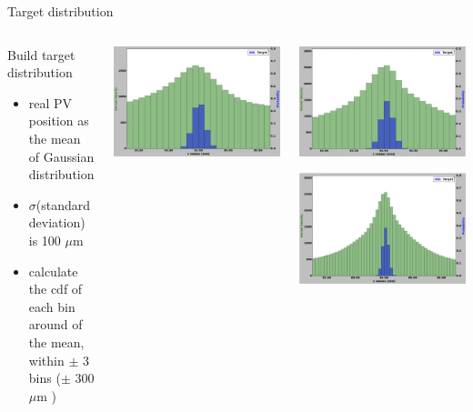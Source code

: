 \begin{frame}{Target distribution}
\begin{columns}[c]
    \begin{block}{Build target distribution}
      \begin{itemize}
          \item real PV position as the mean of Gaussian distribution
          \item $\sigma $(standard deviation) is 100 $\mu$m
          \item calculate the cdf of each bin around of the mean, within $\pm$ 3 bins ($\pm$ 300 $\mu$m )
      \end{itemize}
    \end{block}
    \begin{center}
            \includegraphics[width=1\textwidth,height=0.45\textwidth,trim=18 0 18 0]{images/T_1_12.png}

        \end{center}
      \begin{center}
    \includegraphics[width=1\textwidth,height=0.45\textwidth, trim=18 0 18 0]{images/T_2_12.png}

    \includegraphics[width=1\textwidth,height=0.45\textwidth, trim=18 0 18 0]{images/T_2_25.png}
  \end{center}
  \end{columns}
\end{frame}
